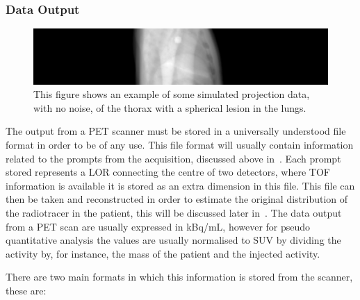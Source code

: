             \subsubsection{Data Output} \label{sec:data_output}
                \begin{figure}
                    \centering
                    
                    \includegraphics[width=1.0\linewidth]{figures/background_projection_data_example.png}
                    
                    \captionsetup{singlelinecheck=false, justification=raggedright}
                    \caption{This figure shows an example of some simulated projection data, with no noise, of the thorax with a spherical lesion in the lungs.} \label{fig:data_output_projection_data_example}
                \end{figure}
                
                The output from a \gls{PET} scanner must be stored in a universally understood file format in order to be of any use. This file format will usually contain information related to the prompts from the acquisition, discussed above in~. Each prompt stored represents a \gls{LOR} connecting the centre of two detectors, where \gls{TOF} information is available it is stored as an extra dimension in this file. This file can then be taken and reconstructed in order to estimate the original distribution of the radiotracer in the patient, this will be discussed later in~. The data output from a \gls{PET} scan are usually expressed in \gls{kBq/mL}, however for pseudo quantitative analysis the values are usually normalised to \gls{SUV} by dividing the activity by, for instance, the mass of the patient and the injected activity.
                
                There are two main formats in which this information is stored from the scanner, these are:
                

